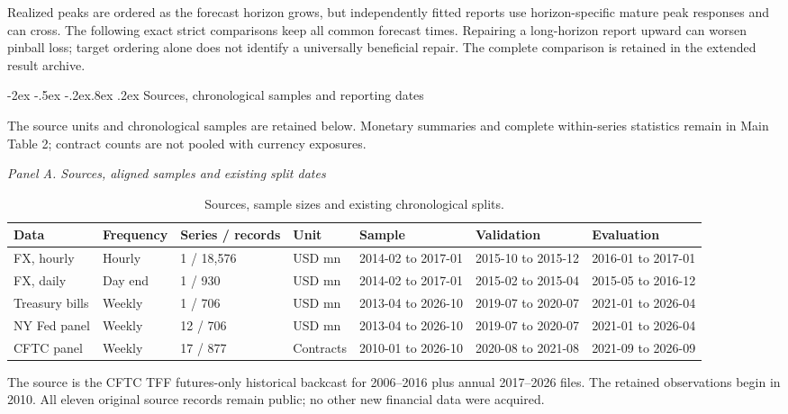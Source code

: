 \documentclass[10pt,a4paper]{article}
\makeatletter
\renewcommand\section{\@startsection{section}{1}{\z@}%
  {-2ex \@plus -.5ex \@minus -.2ex}{.8ex \@plus .2ex}%
  {\normalfont\large\bfseries}}
\makeatother
\begin{document}
Realized peaks are ordered as the forecast horizon grows, but
independently fitted reports use horizon-specific mature peak responses and can
cross. The following exact strict comparisons keep all common forecast times.
Repairing a long-horizon report upward can worsen pinball loss; target ordering
alone does not identify a universally beneficial repair.
The complete comparison is retained in the extended result archive.

\FloatBarrier


\section{Sources, chronological samples and reporting dates}\label{sup:v10-cftc}

The source units and chronological samples are retained below. Monetary summaries and complete within-series statistics remain in Main Table 2; contract counts are not pooled with currency exposures.
\begin{table}[htbp]\centering
\caption{Sources, sample sizes and existing chronological splits.}\label{tab:supplement-data}
\begingroup\fontsize{7.5}{9}\selectfont\setlength{\tabcolsep}{2pt}
\textit{Panel A. Sources, aligned samples and existing split dates}\\[3pt]
\begin{tabular}{@{}lllllll@{}}
\toprule
Data & Frequency & Series / records & Unit & Sample & Validation & Evaluation \\
\midrule
FX, hourly & Hourly & 1 / 18,576 & USD mn & 2014-02 to 2017-01 & 2015-10 to 2015-12 & 2016-01 to 2017-01 \\
FX, daily & Day end & 1 / 930 & USD mn & 2014-02 to 2017-01 & 2015-02 to 2015-04 & 2015-05 to 2016-12 \\
Treasury bills & Weekly & 1 / 706 & USD mn & 2013-04 to 2026-10 & 2019-07 to 2020-07 & 2021-01 to 2026-04 \\
NY Fed panel & Weekly & 12 / 706 & USD mn & 2013-04 to 2026-10 & 2019-07 to 2020-07 & 2021-01 to 2026-04 \\
CFTC panel & Weekly & 17 / 877 & Contracts & 2010-01 to 2026-10 & 2020-08 to 2021-08 & 2021-09 to 2026-09 \\
\bottomrule
\end{tabular}
\endgroup\end{table}

The source is the CFTC TFF futures-only historical backcast for 2006--2016 plus annual 2017--2026 files. The retained observations begin in 2010. All eleven original source records remain public; no other new financial data were acquired.
\end{document}
